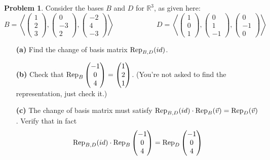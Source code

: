 \documentclass[11pt]{article}
\newcommand{\R}{{\mathbb R}}
\theoremstyle{definition}
\newtheorem{problem}{Problem}
\begin{document}
\begin{problem}
Consider the bases $B$ and $D$ for $\R^3$, as given here:
$$
   B = \left\langle
          \begin{pmatrix} 1\\ 2\\ 3 \end{pmatrix},
          \begin{pmatrix} 0\\ -3\\ 2 \end{pmatrix},
          \begin{pmatrix} -2\\ 4\\ -3 \end{pmatrix}
       \right\rangle
   \qquad\qquad\qquad
   D = \left\langle
          \begin{pmatrix} 1\\ 0\\ 1 \end{pmatrix},
          \begin{pmatrix} 0\\ 1\\ -1 \end{pmatrix},
          \begin{pmatrix} 0\\ -1\\ 0 \end{pmatrix}
       \right\rangle
$$
\begin{itemize}
\item[\bf(a)] Find the change of basis matrix ${\rm Rep}_{B,D}(id)$.
\item[\bf(b)] Check that ${\rm Rep}_{B}\begin{pmatrix} -1\\0\\4 \end{pmatrix} = 
                                       \begin{pmatrix} 1\\2\\1 \end{pmatrix} $.
              (You're not asked to find the representation, just check it.)
\item[\bf(c)] The change of basis matrix must satisfy  
${\rm Rep}_{B,D}(id)\cdot {\rm Rep}_B(\vec v) = {\rm Rep}_D(\vec v)$.
Verify that in fact $${\rm Rep}_{B,D}(id)\cdot {\rm Rep}_B\begin{pmatrix} -1\\0\\4 \end{pmatrix} 
= {\rm Rep}_D\begin{pmatrix} -1\\0\\4 \end{pmatrix}$$
\end{itemize}
\end{problem}
\end{document}
